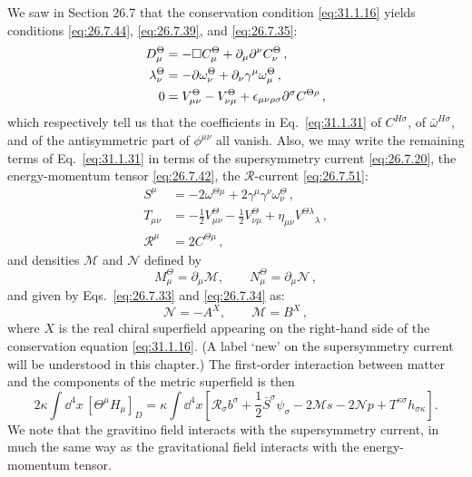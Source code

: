 We saw in Section 26.7 that the conservation condition
\eqref{eq:31.1.16} yields conditions \eqref{eq:26.7.44},
\eqref{eq:26.7.39}, and \eqref{eq:26.7.35}:
\[
  \begin{aligned}
  D_\mu^\Theta
  &=-\Box C_\mu^\Theta+\partial_\mu\partial^\nu C_\nu^\Theta\,,
  \\
  \lambda_\nu^\Theta
  &=-\sl{\partial}\omega_\nu^\Theta
    +\partial_\nu\gamma^\mu\omega_\mu^\Theta\,,
  \\
  0
  &=V_{\mu\nu}^\Theta-V_{\nu\mu}^\Theta
    +\epsilon_{\mu\nu\rho\sigma}\partial^\sigma C^{\Theta\rho}\,,
  \end{aligned}
\]
which respectively tell us that the coefficients in Eq.~\eqref{eq:31.1.31}
of \(C^{H\sigma}\), of \(\bar\omega^{H\sigma}\), and of the antisymmetric
part of \(\phi^{\mu\nu}\) all vanish. Also, we may write the remaining terms
of Eq.~\eqref{eq:31.1.31} in terms of the supersymmetry current
\eqref{eq:26.7.20}, the energy-momentum tensor \eqref{eq:26.7.42}, the
\(\mathcal{R}\)-current \eqref{eq:26.7.51}:
\[
  \begin{aligned}
  S^\mu
  &=-2\omega^{\Theta\mu}
    +2\gamma^\mu\gamma^\nu\omega_\nu^\Theta\,,
  \\
  T_{\mu\nu}
  &=-\frac12V_{\mu\nu}^\Theta-\frac12V_{\nu\mu}^\Theta
    +\eta_{\mu\nu}V^{\Theta\lambda}{}_\lambda\,,
  \\
  \mathcal{R}^\mu&=2C^{\Theta\mu}\,,
  \end{aligned}
\]
and densities \(\mathcal{M}\) and \(\mathcal{N}\) defined by
\begin{equation}
  M_\mu^\Theta=\partial_\mu\mathcal{M},\qquad
  N_\mu^\Theta=\partial_\mu\mathcal{N}\,,
  \tag{31.1.32}\label{eq:31.1.32}
\end{equation}
and given by Eqs.~\eqref{eq:26.7.33} and \eqref{eq:26.7.34} as:
\begin{equation}
  \mathcal{N}=-A^X,\qquad
  \mathcal{M}=B^X\,,
  \tag{31.1.33}\label{eq:31.1.33}
\end{equation}
where \(X\) is the real chiral superfield appearing on the right-hand side of
the conservation equation \eqref{eq:31.1.16}. (A label `new' on the
supersymmetry current will be understood in this chapter.) The first-order
interaction between matter and the components of the metric superfield is
then
\begin{equation}
  2\kappa\int \dd^4x\,[\Theta^\mu H_\mu]_D
  =\kappa\int \dd^4x
  \left[
    \mathcal{R}_\sigma b^\sigma
    +\frac12\bar S^\sigma\psi_\sigma
    -2\mathcal{M}s-2\mathcal{N}p
    +T^{\kappa\sigma}h_{\sigma\kappa}
  \right].
  \tag{31.1.34}\label{eq:31.1.34}
\end{equation}
We note that the gravitino field interacts with the supersymmetry current, in
much the same way as the gravitational field interacts with the
energy-momentum tensor.

